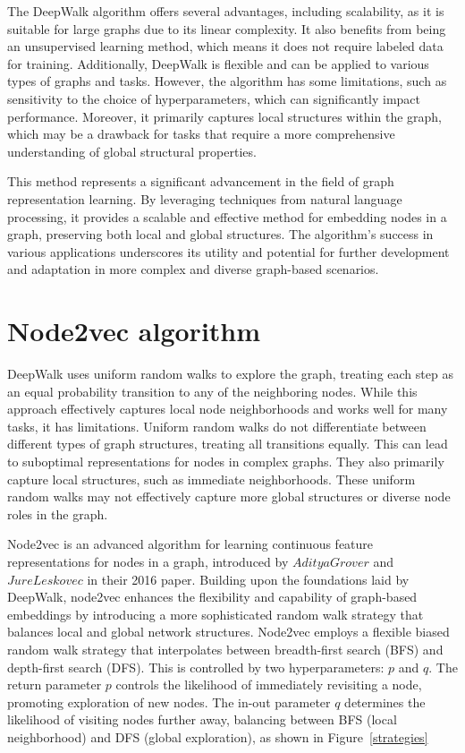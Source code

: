 The DeepWalk algorithm offers several advantages, including scalability, as it is suitable for large graphs due to its linear complexity. It also benefits from being an unsupervised learning method, which means it does not require labeled data for training. Additionally, DeepWalk is flexible and can be applied to various types of graphs and tasks. However, the algorithm has some limitations, such as sensitivity to the choice of hyperparameters, which can significantly impact performance. Moreover, it primarily captures local structures within the graph, which may be a drawback for tasks that require a more comprehensive understanding of global structural properties. 

This method represents a significant advancement in the field of graph representation learning. By leveraging techniques from natural language processing, it provides a scalable and effective method for embedding nodes in a graph, preserving both local and global structures. The algorithm's success in various applications underscores its utility and potential for further development and adaptation in more complex and diverse graph-based scenarios.


\section{Node2vec algorithm}
DeepWalk uses uniform random walks to explore the graph, treating each step as an equal probability transition to any of the neighboring nodes. While this approach effectively captures local node neighborhoods and works well for many tasks, it has limitations. Uniform random walks do not differentiate between different types of graph structures, treating all transitions equally. This can lead to suboptimal representations for nodes in complex graphs. They also primarily capture local structures, such as immediate neighborhoods. These uniform random walks may not effectively capture more global structures or diverse node roles in the graph. 

Node2vec is an advanced algorithm for learning continuous feature representations for nodes in a graph, introduced by $Aditya Grover$ and $Jure Leskovec$ in their 2016 paper.\cite{DBLP:journals/corr/GroverL16} Building upon the foundations laid by DeepWalk, node2vec enhances the flexibility and capability of graph-based embeddings by introducing a more sophisticated random walk strategy that balances local and global network structures. Node2vec employs a flexible biased random walk strategy that interpolates between breadth-first search (BFS) and depth-first search (DFS). This is controlled by two hyperparameters: 
$p$ and $q$. The return parameter $p$ controls the likelihood of immediately revisiting a node, promoting exploration of new nodes. The in-out parameter $q$ determines the likelihood of visiting nodes further away, balancing between BFS (local neighborhood) and DFS (global exploration), as shown in Figure~\ref{strategies}

